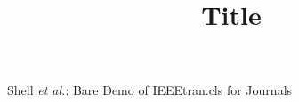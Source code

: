 \documentclass[journal]{IEEEtran}
\begin{document}
\title{Title}
%
%
%

\author{ }


% 
%



%
{Shell \MakeLowercase{\textit{et al.}}: Bare Demo of IEEEtran.cls for Journals}
% 




\maketitle
\end{document}
